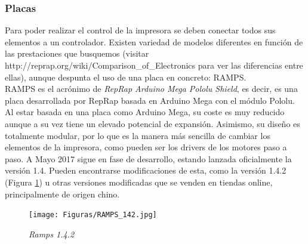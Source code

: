 \documentclass[a4paper,12pt]{article}
\begin{document}
\subsubsection{Placas}
Para poder realizar el control de la impresora se deben conectar todos sus elementos a un controlador. Existen variedad de modelos diferentes en función de las prestaciones que busquemos (visitar http://reprap.org/wiki/Comparison_of_Electronics para ver las diferencias entre ellas), aunque despunta el uso de una placa en concreto: RAMPS.\\

RAMPS es el acrónimo de \emph{RepRap Arduino Mega Pololu Shield}, es decir, es una placa desarrollada por RepRap basada en Arduino Mega con el módulo Pololu. Al estar basada en una placa como Arduino Mega, su coste es muy reducido aunque a su vez tiene un elevado potencial de expansión. Asimismo, su diseño es totalmente modular, por lo que es la manera más sencilla de cambiar los elementos de la impresora, como pueden ser los drivers de los motores paso a paso. A Mayo 2017 sigue en fase de desarrollo, estando lanzada oficialmente la versión 1.4. Pueden encontrarse modificaciones de esta, como la versión 1.4.2 (Figura \ref{figure:Ramps142}) u otras versiones modificadas que se venden en tiendas online, principalmente de origen chino.\\

	\begin{figure}[!ht]
	\begin{center}
	  \texttt{[image: Figuras/RAMPS\_142.jpg]}
	  \caption{\emph{Ramps 1.4.2}}
	\end{center}
	\label{figure:Ramps142}
	\end{figure}
\end{document}
